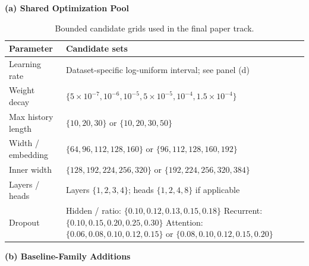 \documentclass[sigconf,review,anonymous]{acmart}
\begin{document}
\begin{table}[!t]
  \centering
  \caption{Bounded candidate grids used in the final paper track.}
  \label{tab:appendix-final-grid}
  \footnotesize

  \begin{minipage}[t]{0.54\textwidth}
    \textbf{(a) Shared Optimization Pool}

    \vspace{0.25em}
    \scriptsize
    \setlength{\tabcolsep}{4pt}
    \renewcommand{\arraystretch}{1.03}
    \begin{tabularx}{\linewidth}{@{}lX@{}}
      \toprule
      Parameter & Candidate sets \\
      \midrule
      Learning rate & Dataset-specific log-uniform interval; see panel (d) \\
      Weight decay & $\{5\times10^{-7},10^{-6},10^{-5},5\times10^{-5},10^{-4},1.5\times10^{-4}\}$ \\
      Max history length & $\{10,20,30\}$ or $\{10,20,30,50\}$ \\
      Width / embedding & $\{64,96,112,128,160\}$ or $\{96,112,128,160,192\}$ \\
      Inner width & $\{128,192,224,256,320\}$ or $\{192,224,256,320,384\}$ \\
      Layers / heads & Layers $\{1,2,3,4\}$; heads $\{1,2,4,8\}$ if applicable \\
      Dropout & Hidden / ratio: $\{0.10,0.12,0.13,0.15,0.18\}$\newline
      Recurrent: $\{0.10,0.15,0.20,0.25,0.30\}$\newline
      Attention: $\{0.06,0.08,0.10,0.12,0.15\}$ or $\{0.08,0.10,0.12,0.15,0.20\}$ \\
      \bottomrule
    \end{tabularx}
  \end{minipage}\hfill
  \begin{minipage}[t]{0.42\textwidth}
    \textbf{(b) Baseline-Family Additions}


\end{minipage}
\end{table}
\end{document}
